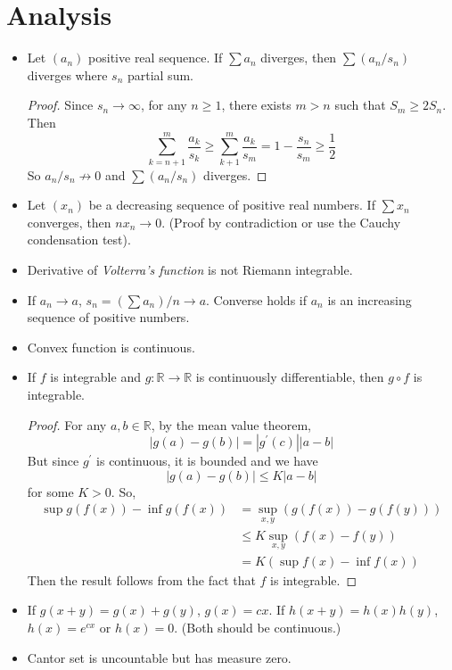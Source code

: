 \documentclass[10pt, a4paper, twoside]{report}
\begin{document}
    \section{Analysis}
    \begin{itemize}
        \item Let \((a_n)\) positive real sequence. If \(\sum a_n\) diverges, then \(\sum(a_n/s_n)\) diverges where \(s_n\) partial sum.
        \begin{proof}
            Since \(s_n\to\infty\), for any \(n\geq 1\), there exists \(m>n\) such that \(S_m\geq 2S_n\). Then 
            \[\sum_{k=n+1}^m\frac{a_k}{s_k}\geq\sum_{k+1}^{m}\frac{a_k}{s_m}=1-\frac{s_n}{s_m}\geq\frac 12\]
            So \(a_n/s_n\nrightarrow 0\) and \(\sum(a_n/s_n)\) diverges.
        \end{proof}
        \item Let \((x_n)\) be a decreasing sequence of positive real numbers. If \(\sum x_n\)  converges, then \(nx_n\to 0\). (Proof by contradiction or use the Cauchy condensation test).
        \item Derivative of \emph{Volterra's function} is not Riemann integrable.
        \item If \(a_n\to a\), \(s_n=(\sum a_n)/n\to a\). Converse holds if \(a_n\) is an increasing sequence of positive numbers.
        \item Convex function is continuous.
        \item If \(f\) is integrable and \(g:\mathbb{R}\to\mathbb{R}\) is continuously differentiable, then \(g\circ f\) is integrable.
        \begin{proof}
            For any \(a,b\in\mathbb{R}\), by the mean value theorem,
            \[|g(a)-g(b)|=|g^\prime(c)||a-b|\]
            But since \(g^\prime\) is continuous, it is bounded and we have 
            \[|g(a)-g(b)|\leq K|a-b|\]
            for some \(K>0\). So,
            \begin{align*}
                \sup g(f(x))-\inf g(f(x))&=\sup_{x,y}(g(f(x))-g(f(y))) \\
                &\leq K\sup_{x,y}(f(x)-f(y)) \\
                &=K(\sup f(x)-\inf f(x))
            \end{align*}
            Then the result follows from the fact that \(f\) is integrable.
        \end{proof}
        \item If \(g(x+y)=g(x)+g(y)\), \(g(x)=cx\). If \(h(x+y)=h(x)h(y)\), \(h(x)=e^{cx}\) or \(h(x)=0\). (Both should be continuous.)
        \item Cantor set is uncountable but has measure zero.
    \end{itemize}
\end{document}
